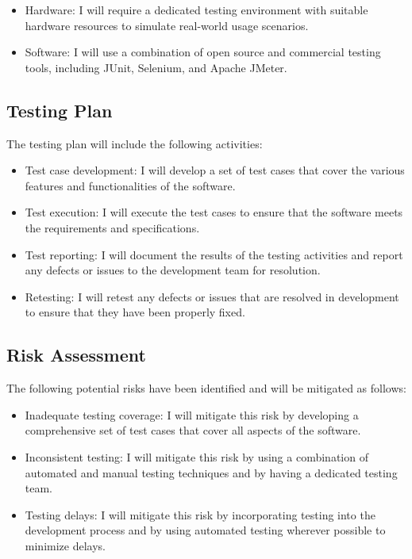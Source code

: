 \documentclass{article}
\begin{document}
\begin{itemize}
\item Hardware: I will require a dedicated testing environment with suitable hardware resources to simulate real-world usage scenarios.
\item Software: I will use a combination of open source and commercial testing tools, including JUnit, Selenium, and Apache JMeter.
\end{itemize}

\subsection{Testing Plan}
The testing plan will include the following activities:

\begin{itemize}
\item Test case development: I will develop a set of test cases that cover the various features and functionalities of the software.
\item Test execution: I will execute the test cases to ensure that the software meets the requirements and specifications.
\item Test reporting: I will document the results of the testing activities and report any defects or issues to the development team for resolution.
\item Retesting: I will retest any defects or issues that are resolved in development to ensure that they have been properly fixed.
\end{itemize}

\subsection{Risk Assessment}
The following potential risks have been identified and will be mitigated as follows:

\begin{itemize}
\item Inadequate testing coverage: I will mitigate this risk by developing a comprehensive set of test cases that cover all aspects of the software.
\item Inconsistent testing: I will mitigate this risk by using a combination of automated and manual testing techniques and by having a dedicated testing team.
\item Testing delays: I will mitigate this risk by incorporating testing into the development process and by using automated testing wherever possible to minimize delays.
\end{itemize}
\newpage
\end{document}
